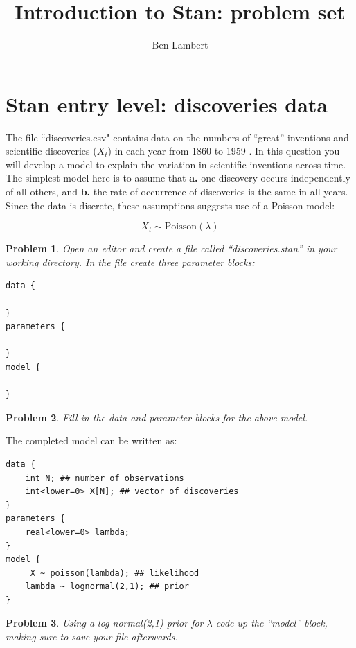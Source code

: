 \documentclass{article}
\title{Introduction to Stan: problem set}
\date{}
\author{Ben Lambert}
\newtheorem{problem}{Problem}[section]
\begin{document}
\maketitle

\section{Stan entry level: discoveries data}
The file ``discoveries.csv" contains data on the numbers of ``great'' inventions and scientific discoveries ($X_t$) in each year from 1860 to 1959 \citep{discoveries}. In this question you will develop a model to explain the variation in scientific inventions across time. The simplest model here is to assume that \textbf{a.} one discovery occurs independently of all others, and \textbf{b.} the rate of occurrence of discoveries is the same in all years. Since the data is discrete, these assumptions suggests use of a Poisson model:

\begin{equation}
X_t\sim \text{Poisson}(\lambda)
\end{equation}

\begin{problem}
Open an editor and create a file called ``discoveries.stan'' in your working directory. In the file create three parameter blocks:
	
\begin{verbatim}
data {
	
}
parameters {
	
}
model {
	
}
\end{verbatim}	
\end{problem}

\begin{problem}
Fill in the data and parameter blocks for the above model.
\end{problem}

The completed model can be written as:
\begin{verbatim}
data {
    int N; ## number of observations
    int<lower=0> X[N]; ## vector of discoveries
}
parameters {
    real<lower=0> lambda;
} 
model {
     X ~ poisson(lambda); ## likelihood
    lambda ~ lognormal(2,1); ## prior
}
\end{verbatim}	


\begin{problem}
	Using a log-normal(2,1)  prior for $\lambda$ code up the ``model'' block, making sure to save your file afterwards.
\end{problem}
\end{document}

